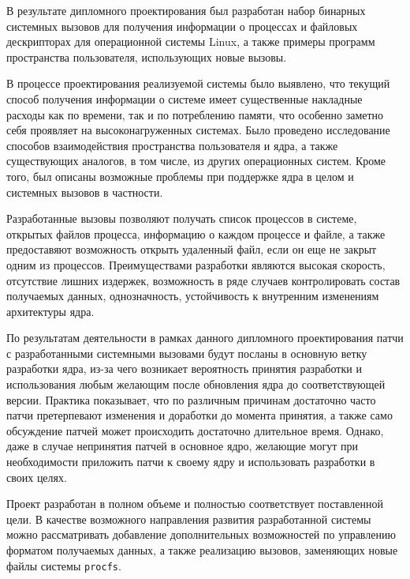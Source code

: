 \pagebreak
{}
\label{sec:outro}

В результате дипломного проектирования был разработан набор бинарных системных
вызовов для получения информации о процессах и файловых дескрипторах для
операционной системы Linux, а также примеры программ пространства пользователя,
использующих новые вызовы.

В процессе проектирования реализуемой системы было выявлено, что текущий способ
получения информации о системе имеет существенные накладные расходы как по
времени, так и по потреблению памяти, что особенно заметно себя проявляет на
высоконагруженных системах. Было проведено исследование способов взаимодействия
пространства пользователя и ядра, а также существующих аналогов, в том числе, из
других операционных систем. Кроме того, был описаны возможные проблемы при
поддержке ядра в целом и системных вызовов в частности.

Разработанные вызовы позволяют получать список процессов в системе, открытых
файлов процесса, информацию о каждом процессе и файле, а также предоставяют
возможность открыть удаленный файл, если он еще не закрыт одним из процессов.
Преимуществами разработки являются высокая скорость, отсутствие лишних издержек,
возможность в ряде случаев контролировать состав получаемых данных,
однозначность, устойчивость к внутренним изменениям архитектуры ядра.

По результатам деятельности в рамках данного дипломного проектирования патчи с
разработанными системными вызовами будут посланы в основную ветку разработки
ядра, из-за чего возникает вероятность принятия разработки и использования
любым желающим после обновления ядра до соответствующей версии. Практика
показывает, что по различным причинам достаточно часто патчи претерпевают
изменения и доработки до момента принятия, а также само обсуждение патчей может
происходить достаточно длительное время. Однако, даже в случае непринятия патчей
в основное ядро, желающие могут при необходимости приложить патчи к своему ядру
и использовать разработки в своих целях.

Проект разработан в полном объеме и полностью соответствует поставленной цели. В
качестве возможного направления развития разработанной системы можно
рассматривать добавление дополнительных возможностей по управлению форматом
получаемых данных, а также реализацию вызовов, заменяющих новые файлы системы
\texttt{procfs}.
